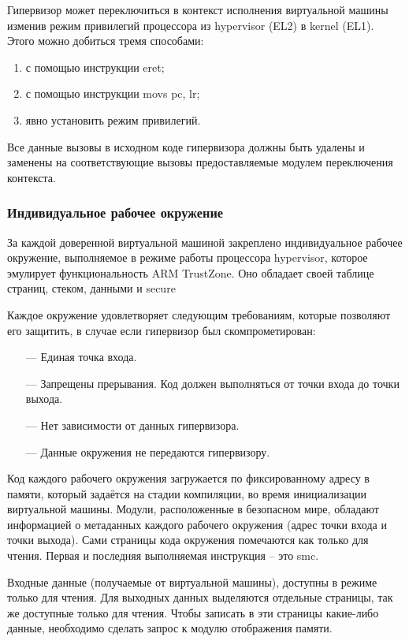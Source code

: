 Гипервизор может переключиться в контекст исполнения виртуальной машины изменив режим привилегий процессора из hypervisor (EL2) в kernel (EL1). Этого можно добиться тремя способами:

\begin{enumerate}
	\item с помощью инструкции eret;
	\item с помощью инструкции movs pc, lr;
	\item явно установить режим привилегий.
\end{enumerate}

Все данные вызовы в исходном коде гипервизора должны быть удалены и заменены на соответствующие вызовы предоставляемые модулем переключения контекста.

\subsubsection{Индивидуальное рабочее окружение}

За каждой доверенной виртуальной машиной закреплено индивидуальное рабочее окружение, выполняемое в режиме работы процессора hypervisor, которое эмулирует функциональность ARM TrustZone. Оно обладает своей таблице страниц, стеком, данными и secure

Каждое окружение удовлетворяет следующим требованиям, которые позволяют его защитить, в случае если гипервизор был скомпрометирован:

\begin{itemize}
	\item [---] Единая точка входа.
	\item [---] Запрещены прерывания. Код должен выполняться от точки входа до точки выхода.
	\item [---] Нет зависимости от данных гипервизора.
	\item [---] Данные окружения не передаются гипервизору.
\end{itemize}

Код каждого рабочего окружения загружается по фиксированному адресу в памяти, который задаётся на стадии компиляции, во время инициализации виртуальной машины. Модули, расположенные в безопасном мире, обладают информацией о метаданных каждого рабочего окружения (адрес точки входа и точки выхода). Сами страницы кода окружения помечаются как только для чтения. Первая и последняя выполняемая инструкция -- это smc. 

Входные данные (получаемые от виртуальной машины), доступны в режиме только для чтения. Для выходных данных выделяются отдельные страницы, так же доступные только для чтения. Чтобы записать в эти страницы какие-либо данные, необходимо сделать запрос к модулю отображения памяти. 

